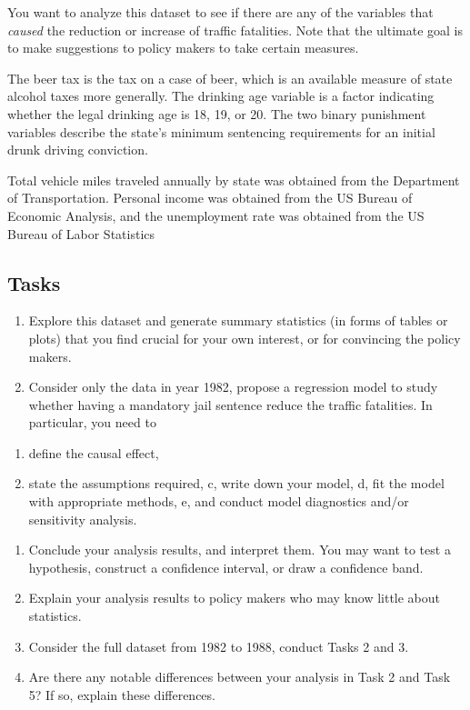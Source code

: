 \documentclass[12pt,]{book}
\providecommand{\tightlist}{%
  \setlength{\itemsep}{0pt}\setlength{\parskip}{0pt}}
\begin{document}
You want to analyze this dataset to see if there are any of the
variables that \emph{caused} the reduction or increase of traffic
fatalities. Note that the ultimate goal is to make suggestions to policy
makers to take certain measures.

The beer tax is the tax on a case of beer, which is an available measure
of state alcohol taxes more generally. The drinking age variable is a
factor indicating whether the legal drinking age is 18, 19, or 20. The
two binary punishment variables describe the state's minimum sentencing
requirements for an initial drunk driving conviction.

Total vehicle miles traveled annually by state was obtained from the
Department of Transportation. Personal income was obtained from the US
Bureau of Economic Analysis, and the unemployment rate was obtained from
the US Bureau of Labor Statistics

\subsection{Tasks}\label{tasks-2}

\begin{enumerate}
\def\labelenumi{\arabic{enumi}.}
\tightlist
\item
  Explore this dataset and generate summary statistics (in forms of
  tables or plots) that you find crucial for your own interest, or for
  convincing the policy makers.
\item
  Consider only the data in year 1982, propose a regression model to
  study whether having a mandatory jail sentence reduce the traffic
  fatalities. In particular, you need to
\end{enumerate}

\begin{enumerate}
\def\labelenumi{\alph{enumi}.}
\tightlist
\item
  define the causal effect,
\item
  state the assumptions required, c, write down your model, d, fit the
  model with appropriate methods, e, and conduct model diagnostics
  and/or sensitivity analysis.
\end{enumerate}

\begin{enumerate}
\def\labelenumi{\arabic{enumi}.}
\setcounter{enumi}{2}
\tightlist
\item
  Conclude your analysis results, and interpret them. You may want to
  test a hypothesis, construct a confidence interval, or draw a
  confidence band.
\item
  Explain your analysis results to policy makers who may know little
  about statistics.
\item
  Consider the full dataset from 1982 to 1988, conduct Tasks 2 and 3.
\item
  Are there any notable differences between your analysis in Task 2 and
  Task 5? If so, explain these differences.
\end{enumerate}
\end{document}
